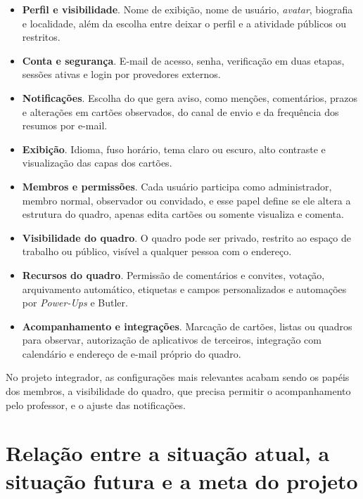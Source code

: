 \documentclass[11pt]{ifscarticle}
\begin{document}
\begin{itemize}
  \item \textbf{Perfil e visibilidade}. Nome de exibição, nome de usuário,
  \textit{avatar}, biografia e localidade, além da escolha entre deixar o
  perfil e a atividade públicos ou restritos.

  \item \textbf{Conta e segurança}. E-mail de acesso, senha, verificação em
  duas etapas, sessões ativas e login por provedores externos.

  \item \textbf{Notificações}. Escolha do que gera aviso, como menções,
  comentários, prazos e alterações em cartões observados, do canal de envio
  e da frequência dos resumos por e-mail.

  \item \textbf{Exibição}. Idioma, fuso horário, tema claro ou escuro, alto
  contraste e visualização das capas dos cartões.

  \item \textbf{Membros e permissões}. Cada usuário participa como
  administrador, membro normal, observador ou convidado, e esse papel define
  se ele altera a estrutura do quadro, apenas edita cartões ou somente
  visualiza e comenta.

  \item \textbf{Visibilidade do quadro}. O quadro pode ser privado, restrito
  ao espaço de trabalho ou público, visível a qualquer pessoa com o endereço.

  \item \textbf{Recursos do quadro}. Permissão de comentários e convites,
  votação, arquivamento automático, etiquetas e campos personalizados e
  automações por \textit{Power-Ups} e Butler.

  \item \textbf{Acompanhamento e integrações}. Marcação de cartões, listas ou
  quadros para observar, autorização de aplicativos de terceiros, integração
  com calendário e endereço de e-mail próprio do quadro.
\end{itemize}

No projeto integrador, as configurações mais relevantes acabam sendo os
papéis dos membros, a visibilidade do quadro, que precisa permitir o
acompanhamento pelo professor, e o ajuste das notificações.

\section{Relação entre a situação atual, a situação futura e a meta do projeto}
\end{document}
